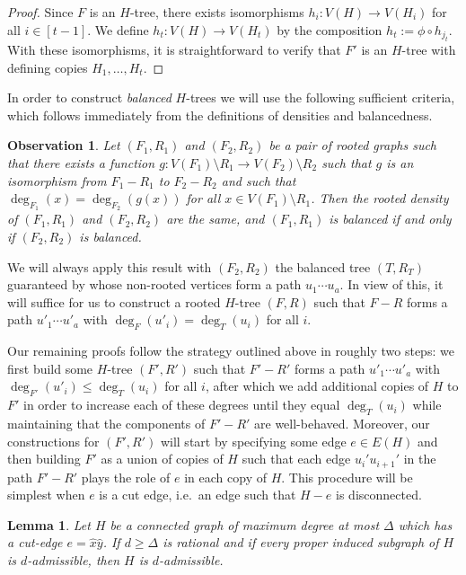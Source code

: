 \documentclass[12pt,letterpaper]{article}
\newtheorem{lemma}[theorem]{Lemma}
\newtheorem{observation}[theorem]{Observation}
\theoremstyle{definition}
\begin{document}
	\begin{proof}
		Since $F$ is an $H$-tree, there exists isomorphisms $h_i:V(H)\to V(H_i)$ for all $i\in [t-1]$. We define $h_t:V(H)\to V(H_t)$ by the composition $h_t:=\phi\circ h_{j_t}$. With these isomorphisms, it is straightforward to verify that $F'$ is an $H$-tree with defining copies $H_1,\dots,H_t$.
	\end{proof}
	
	In order to construct \textit{balanced} $H$-trees we will use the following sufficient criteria, which follows immediately from the definitions of densities and balancedness.
	
	\begin{observation}\label{observation easy balanced condition}
		Let $(F_1,R_1)$ and $(F_2,R_2)$ be a pair of rooted graphs such that there exists a function $g:V(F_1)\setminus R_1\to V(F_2)\setminus R_2$ such that $g$ is an isomorphism from $F_1-R_1$ to $F_2-R_2$ and such that $\deg_{F_1}(x)=\deg_{F_2}(g(x))$ for all $x\in V(F_1)\setminus R_1$. Then the rooted density of $(F_1,R_1)$ and $(F_2,R_2)$ are the same, and $(F_1,R_1)$ is balanced if and only if $(F_2,R_2)$ is balanced.
	\end{observation}
	We will always apply this result with $(F_2,R_2)$ the balanced tree $(T,R_T)$ guaranteed by  whose non-rooted vertices form a path $u_1\cdots u_a$.  In view of this, it  will suffice for us to construct a rooted $H$-tree $(F,R)$ such that $F-R$ forms a path $u'_1\cdots u'_a$ with $\deg_F(u'_i)=\deg_T(u_i)$ for all $i$.  
	
	Our remaining proofs follow the strategy outlined above in roughly two steps: we first build some $H$-tree $(F',R')$ such that $F'-R'$ forms a path $u'_1\cdots u'_a$ with $\deg_{F'}(u'_i)\le \deg_T(u_i)$ for all $i$, after which we add additional copies of $H$ to $F'$ in order to increase each of these degrees until they equal $\deg_T(u_i)$ while maintaining that the components of $F'-R'$ are well-behaved.  Moreover, our constructions for $(F',R')$ will start by specifying some edge $e\in E(H)$ and then building $F'$ as a union of copies of $H$ such that each edge $u_i'u_{i+1}'$ in the path $F'-R'$ plays the role of $e$ in each copy of $H$.  This procedure will be simplest when $e$ is a cut edge, i.e.\ an edge such that $H-e$ is disconnected.
	
	\begin{lemma}\label{lemma cut edge dadmissible}
		Let $H$ be a connected graph of maximum degree at most $\Delta$ which has a cut-edge $e=\hat{x}\hat{y}$.  If $d\ge \Delta$ is rational and if every proper induced subgraph of $H$ is $d$-admissible, then $H$ is $d$-admissible.
	\end{lemma}
	
\end{document}

